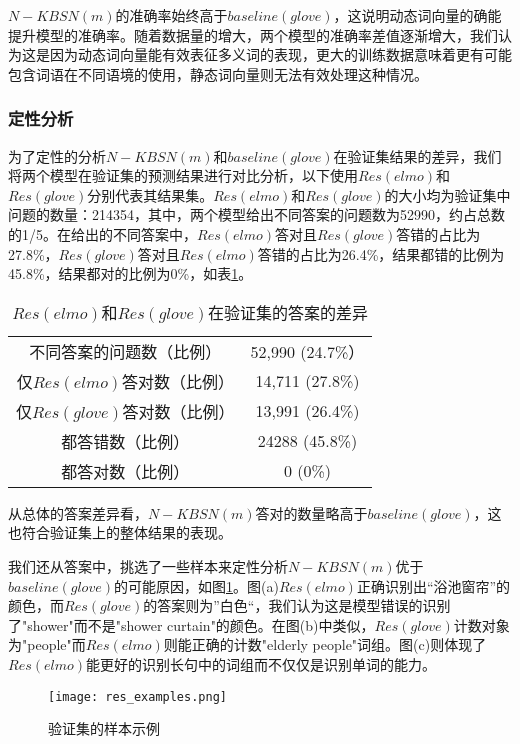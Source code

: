 $N-KBSN(m)$的准确率始终高于$baseline(glove)$，这说明动态词向量的确能提升模型的准确率。随着数据量的增大，两个模型的准确率差值逐渐增大，我们认为这是因为动态词向量能有效表征多义词的表现，更大的训练数据意味着更有可能包含词语在不同语境的使用，静态词向量则无法有效处理这种情况。

\subsubsection{定性分析}
为了定性的分析$N-KBSN(m)$和$baseline(glove)$在验证集结果的差异，我们将两个模型在验证集的预测结果进行对比分析，以下使用$Res(elmo)$和$Res(glove)$分别代表其结果集。$Res(elmo)$和$Res(glove)$的大小均为验证集中问题的数量：214354，其中，两个模型给出不同答案的问题数为52990，约占总数的1/5。在给出的不同答案中，$Res(elmo)$答对且$Res(glove)$答错的占比为27.8\%，$Res(glove)$答对且$Res(elmo)$答错的占比为26.4\%，结果都错的比例为45.8\%，结果都对的比例为0\%，如表\ref{diff}。
\begin{table}[H]
\centering
\caption{$Res(elmo)$和$Res(glove)$在验证集的答案的差异}
\begin{tabular}{cc}
\toprule
不同答案的问题数（比例） & 52,990 (24.7\%）\\
仅$Res(elmo)$答对数（比例） & 14,711 (27.8\%)\\
仅$Res(glove)$答对数（比例） & 13,991 (26.4\%)\\
都答错数（比例）& 24288 (45.8\%)\\
都答对数（比例）& 0 (0\%) \\
\bottomrule
\end{tabular}
\label{diff}
\end{table}
从总体的答案差异看，$N-KBSN(m)$答对的数量略高于$baseline(glove)$，这也符合验证集上的整体结果的表现。

我们还从答案中，挑选了一些样本来定性分析$N-KBSN(m)$优于$baseline(glove)$的可能原因，如图\ref{res_examples}。图(a)$Res(elmo)$正确识别出“浴池窗帘”的颜色，而$Res(glove)$的答案则为”白色“，我们认为这是模型错误的识别了"shower"而不是"shower curtain"的颜色。在图(b)中类似，$Res(glove)$计数对象为"people"而$Res(elmo)$则能正确的计数"elderly people"词组。图(c)则体现了$Res(elmo)$能更好的识别长句中的词组而不仅仅是识别单词的能力。
\begin{figure}[H]
	\texttt{[image: res\_examples.png]}
	\caption{验证集的样本示例}
	\label{res_examples}
\end{figure}

